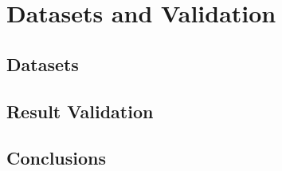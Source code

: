 \chapter{Datasets and Validation}\label{chap:validation}

\section*{}

\section{Datasets}\label{sec:datasets}

\section{Result Validation}\label{sec:validation}

\section{Conclusions}
